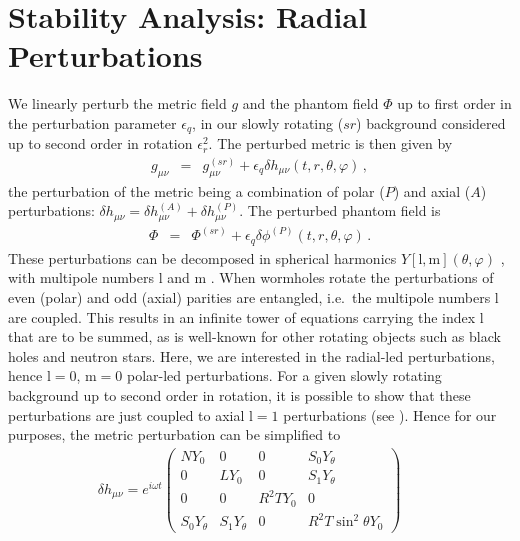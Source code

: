 \documentclass{article}
\begin{document}
\section{Stability Analysis:
Radial Perturbations}

We linearly perturb the metric field $g$ and the phantom field $\Phi$ up to first order in the perturbation parameter $\epsilon_q$, in our slowly rotating ($sr$) background considered up to second order in rotation $\epsilon_r^2$.
The perturbed metric is then given by
\begin{eqnarray}
g_{\mu\nu} &=& g^{(sr)}_{\mu\nu} + \epsilon_q \delta h_{\mu\nu}(t,r,\theta,{\varphi}) \, , 
\end{eqnarray}
%
%
the perturbation of the metric being a combination of polar ($P$) and axial ($A$) perturbations:
$ \delta h_{\mu\nu}=\delta h^{(A)}_{\mu\nu} + \delta h^{(P)}_{\mu\nu}$.
The perturbed phantom field is
\begin{eqnarray}
\Phi &=& {\Phi}^{(sr)} + \epsilon_q \delta{\phi}^{(P)} (t,r,\theta,{\varphi})
%
\, .
\end{eqnarray}
These perturbations can be decomposed in spherical harmonics 
$Y[\mathrm{l},\mathrm{m}](\theta,{\varphi})$ , 
with multipole numbers $\mathrm{l}$ and $\mathrm{m}$
\cite{Blazquez-Salcedo:2022eik}.
When wormholes rotate the perturbations of even (polar) and odd (axial) parities are entangled, i.e.~the multipole numbers $\mathrm{l}$ are coupled.
This results in an infinite tower of equations carrying the index $\mathrm{l}$ that are to be summed, as is well-known for other rotating objects such as black holes and neutron stars.
%
Here, we are interested in the radial-led perturbations, hence $\mathrm{l}=0$, $\mathrm{m}=0$ polar-led perturbations. 
For a given slowly rotating background up to second order in rotation, it is possible to show that these perturbations are just coupled to axial $\mathrm{l}=1$ perturbations ({see} \cite{Blazquez-Salcedo:2022eik}). Hence for our purposes, the metric perturbation can be simplified {to}
\begin{eqnarray}
\label{met_pert}
\delta h_{\mu\nu}= e^{i\omega t}
    \begin{pmatrix}
NY_0 & 0    & 0 & {S}_0 Y_\theta \\
0   & LY_0 & 0 & {S}_1 Y_\theta \\
0 & 0 & R^2 TY_0 & 0 \\
{S}_0 Y_\theta & {S}_1 Y_\theta & 0 & R^2 T\sin^2{\theta}Y_0
\end{pmatrix} \, \, \, \, \, \, \, \, \,
\end{eqnarray}
\end{document}
